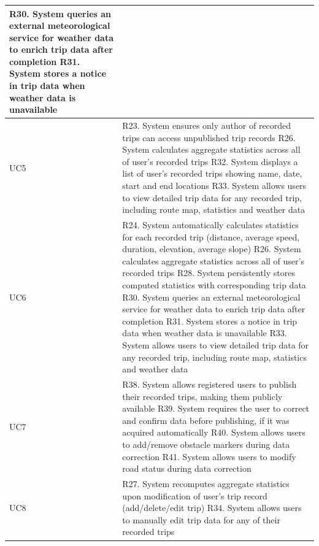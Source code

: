 \begin{longtable}{|p{3cm}|p{12cm}|}
   R30. System queries an external meteorological service for weather data to enrich trip data after completion \newline 
   R31. System stores a notice in trip data when weather data is unavailable \\ \hline
   UC5 & 
   R23. System ensures only author of recorded trips can access unpublished trip records \newline 
   R26. System calculates aggregate statistics across all of user’s recorded trips \newline 
   R32. System displays a list of user’s recorded trips showing name, date, start and end locations \newline 
   R33. System allows users to view detailed trip data for any recorded trip, including route map, statistics and weather data \\ \hline
   UC6 & 
   R24. System automatically calculates statistics for each recorded trip (distance, average speed, duration, elevation, average slope) \newline 
   R26. System calculates aggregate statistics across all of user’s recorded trips \newline 
   R28. System persistently stores computed statistics with corresponding trip data \newline 
   R30. System queries an external meteorological service for weather data to enrich trip data after completion \newline 
   R31. System stores a notice in trip data when weather data is unavailable \newline 
   R33. System allows users to view detailed trip data for any recorded trip, including route map, statistics and weather data \\ \hline
   UC7 & 
   R38. System allows registered users to publish their recorded trips, making them publicly available \newline 
   R39. System requires the user to correct and confirm data before publishing, if it was acquired automatically \newline 
   R40. System allows users to add/remove obstacle markers during data correction \newline 
   R41. System allows users to modify road status during data correction \\ \hline
   UC8 & 
   R27. System recomputes aggregate statistics upon modification of user’s trip record (add/delete/edit trip) \newline 
   R34. System allows users to manually edit trip data for any of their recorded trips \newline 

\end{longtable}
